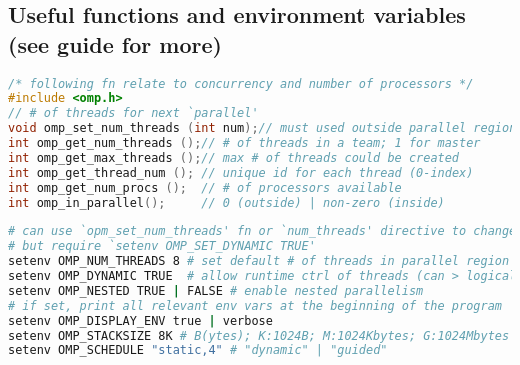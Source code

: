 \subsection*{Useful functions and environment variables (see guide for more)}
\begin{lstlisting}[language=C]
/* following fn relate to concurrency and number of processors */
#include <omp.h>
// # of threads for next `parallel'
void omp_set_num_threads (int num);// must used outside parallel region
int omp_get_num_threads ();// # of threads in a team; 1 for master
int omp_get_max_threads ();// max # of threads could be created
int omp_get_thread_num (); // unique id for each thread (0-index)
int omp_get_num_procs ();  // # of processors available
int omp_in_parallel();     // 0 (outside) | non-zero (inside)
\end{lstlisting}
\begin{lstlisting}[language=bash,framesep=1pt,xleftmargin=-2pt,xrightmargin=-2pt]
# can use `opm_set_num_threads' fn or `num_threads' directive to change
# but require `setenv OMP_SET_DYNAMIC TRUE'
setenv OMP_NUM_THREADS 8 # set default # of threads in parallel region
setenv OMP_DYNAMIC TRUE  # allow runtime ctrl of threads (can > logical)
setenv OMP_NESTED TRUE | FALSE # enable nested parallelism
# if set, print all relevant env vars at the beginning of the program
setenv OMP_DISPLAY_ENV true | verbose
setenv OMP_STACKSIZE 8K # B(ytes); K:1024B; M:1024Kbytes; G:1024Mbytes
setenv OMP_SCHEDULE "static,4" # "dynamic" | "guided"
\end{lstlisting}
